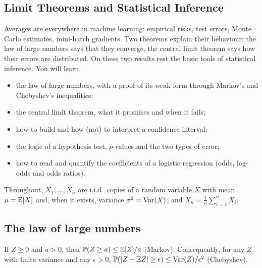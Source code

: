 \begin{notechapter}
\chapter{Limit Theorems and Statistical Inference}\label{ch:lln-clt-inference}

\begin{chapterintro}
Averages are everywhere in machine learning: empirical risks, test errors,
Monte Carlo estimates, mini-batch gradients. Two theorems explain their
behaviour: the law of large numbers says that they converge, the central limit
theorem says how their errors are distributed. On these two results rest the
basic tools of statistical inference. You will learn
\begin{itemize}[nosep]
  \item the law of large numbers, with a proof of its weak form through
        Markov's and Chebyshev's inequalities;
  \item the central limit theorem, what it promises and when it fails;
  \item how to build and how (not) to interpret a confidence interval;
  \item the logic of a hypothesis test, $p$-values and the two types of error;
  \item how to read and quantify the coefficients of a logistic regression
        (odds, log-odds and odds ratios).
\end{itemize}
\end{chapterintro}

Throughout, $X_1,\dots,X_n$ are i.i.d.\ copies of a random variable $X$ with
mean $\mu = \mathbb{E}[X]$ and, when it exists, variance $\sigma^2 = \operatorname{Var}(X)$, and
$\bar X_n = \frac1n\sum_{i=1}^nX_i$.

\section{The law of large numbers}\label{lln-clt-inference:sec:lln}

\begin{lemma}\label{lln-clt-inference:lem:chebyshev}
If $Z\geq0$ and $a>0$, then $\mathbb{P}(Z\geq a)\leq\mathbb{E}[Z]/a$ (Markov). Consequently,
for any $Z$ with finite variance and any $\epsilon>0$,
$\mathbb{P}(\left|Z - \mathbb{E} Z\right|\geq\epsilon)\leq\operatorname{Var}(Z)/\epsilon^2$ (Chebyshev).
\end{lemma}


\end{notechapter}
